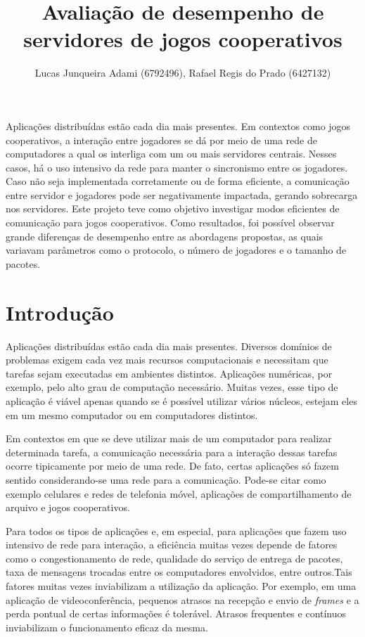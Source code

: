 \documentclass[12pt]{article}
\title{Avaliação de desempenho de servidores de jogos cooperativos}
\author{Lucas Junqueira Adami (6792496)\inst{1}, Rafael Regis do Prado (6427132)\inst{1}}
\begin{document}
 

\maketitle

\begin{resumo} %
Aplicações distribuídas estão cada dia mais presentes. Em contextos como jogos
cooperativos, a interação entre jogadores se dá por meio de uma rede de
computadores a qual os interliga com um ou mais servidores centrais. Nesses
casos, há o uso intensivo da rede para manter o sincronismo entre os jogadores.
Caso não seja implementada corretamente ou de forma eficiente, a comunicação
entre servidor e jogadores pode ser negativamente impactada, gerando sobrecarga
nos servidores. Este projeto teve como objetivo investigar modos eficientes de
comunicação para jogos cooperativos. Como resultados, foi possível observar
grande diferenças de desempenho entre as abordagens propostas, as quais
variavam parâmetros como o protocolo, o número de jogadores e o tamanho de
pacotes.
\end{resumo}

\section{Introdução} \label{sec:introducao}

Aplicações distribuídas estão cada dia mais presentes. Diversos domínios de
problemas exigem cada vez mais recursos computacionais e necessitam que tarefas
sejam executadas em ambientes distintos. Aplicações numéricas, por exemplo,
pelo alto grau de computação necessário. Muitas vezes, esse tipo de aplicação é
viável apenas quando se é possível utilizar vários núcleos, estejam eles em um
mesmo computador ou em computadores distintos.

Em contextos em que se deve utilizar mais de um computador para realizar
determinada tarefa, a comunicação necessária para a interação dessas tarefas
ocorre tipicamente por meio de uma rede. De fato, certas aplicações só fazem
sentido considerando-se uma rede para a comunicação. Pode-se citar como exemplo
celulares e redes de telefonia móvel, aplicações de compartilhamento de arquivo
e jogos cooperativos.

Para todos os tipos de aplicações e, em especial, para aplicações que fazem uso
intensivo de rede para interação, a eficiência muitas vezes depende de fatores
como o congestionamento de rede, qualidade do serviço de entrega de pacotes,
taxa de mensagens trocadas entre os computadores envolvidos, entre outros.Tais
fatores muitas vezes inviabilizam a utilização da aplicação. Por exemplo, em
uma aplicação de videoconferência, pequenos atrasos na recepção e envio de
\textit{frames} e a perda pontual de certas informações é tolerável. Atrasos
frequentes e contínuos inviabilizam o funcionamento eficaz da mesma.
\end{document}
